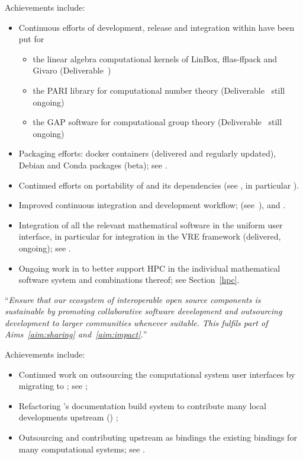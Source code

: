 \begin{compactenum}[\bf O1\rm:]
Achievements include:
\begin{itemize}
  \item Continuous efforts of development, release and integration within \Sage
    have been put for
    \begin{itemize}
    \item  the linear algebra computational kernels of LinBox,
    fflas-ffpack and Givaro (Deliverable~)
    \item the PARI library for computational number theory
    (Deliverable~ still ongoing)
    \item the GAP software for computational group theory
    (Deliverable~ still ongoing)
  \end{itemize}
\item Packaging efforts: docker containers (delivered and regularly
  updated), Debian and Conda packages (beta); see
  .
\item Continued efforts on portability of \Sage and its dependencies
  (see , in
  particular ).
\item Improved continuous integration and development workflow;
  (see~), and
  .
\item Integration of all the relevant mathematical software in the
  uniform \Jupyter user interface, in particular for integration in
  the VRE framework (delivered, ongoing); see
  .
\item Ongoing work in  to better support HPC in the
  individual mathematical software system and combinations thereof;
  see Section~\ref{hpc}.
\end{itemize}

\item \label{objective:sustainable} ``\emph{Ensure that our ecosystem of
  interoperable open source components is \emph{sustainable} by
  promoting collaborative software development and outsourcing
  development to larger communities whenever suitable. This fulfils
  part of Aims~\ref{aim:sharing} and~\ref{aim:impact}.}''

Achievements include:
\begin{itemize}
\item Continued work on outsourcing the computational system user
  interfaces by migrating to \Jupyter; see ;
\item Refactoring \Sage's documentation build system to contribute many local developments
  upstream (\Sphinx) ;
\item Outsourcing and contributing upstream as \Python bindings the existing \Sage
  bindings for many computational systems; see .
\end{itemize}


\end{compactenum}

